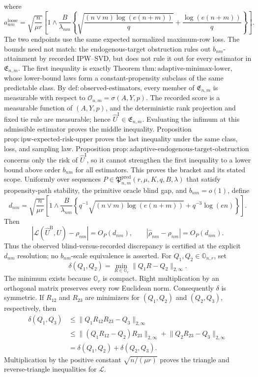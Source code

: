 where
\[
 a^{\mathrm{loose}}_{nm}=
 \sqrt{\frac n{\mu r}}\left[1\wedge
 \frac B{\lambda_{nm}}\left\{
 \sqrt{\frac{(n\vee m)\log(e(n+m))}{q}}+
 \frac{\log(e(n+m))}{q}\right\}\right].
\]
The two endpoints use the same expected normalized maximum-row loss.  The bounds need not match: the endogenous-target obstruction rules out \(b_{nm}\)-attainment by recorded IPW--SVD, but does not rule it out for every estimator in \(\mathfrak E_{n,m}\).
The first inequality is exactly Theorem \(\mathrm{thm:adaptive\mbox{-}minimax\mbox{-}lower}\), whose lower-bound laws form a constant-propensity subclass of the same predictable class.  By \(\mathrm{def:observed\mbox{-}estimators}\), every member of \(\mathfrak E_{n,m}\) is measurable with respect to \(\mathcal O_{n,m}=\sigma(A,Y,p)\).  The recorded score is a measurable function of \((A,Y,p)\), and the deterministic rank projection and fixed tie rule are measurable; hence \(\widehat U^{\mathrm I}\in\mathfrak E_{n,m}\).  Evaluating the infimum at this admissible estimator proves the middle inequality.  Proposition \(\mathrm{prop:ipw\mbox{-}expected\mbox{-}risk\mbox{-}upper}\) proves the last inequality under the same class, loss, and sampling law.  Proposition \(\mathrm{prop:adaptive\mbox{-}endogenous\mbox{-}target\mbox{-}obstruction}\) concerns only the risk of \(\widehat U^{\mathrm I}\), so it cannot strengthen the first inequality to a lower bound above order \(b_{nm}\) for all estimators.  This proves the bracket and its stated scope.
Uniformly over sequences \(P\in\mathfrak P^{\mathrm{pred}}_{n,m}(r,\mu,K,q,B,\lambda)\) that satisfy propensity-path stability, the primitive oracle blind gap, and \(b_{nm}=o(1)\), define
\[
 d_{nm}=\sqrt{\frac n{\mu r}}\left[1\wedge
 \frac B{\lambda_{nm}}\left\{
 q^{-1}\sqrt{(n\vee m)\log(e(n+m))}+q^{-3}\log(en)
 \right\}\right].
\]
Then
\[
 \left|\mathcal L(\widehat U^{\mathrm B},U)-\rho_{nm}\right|=O_P(d_{nm}),
 \qquad
 |\widehat\rho_{nm}-\rho_{nm}|=O_P(d_{nm}).
\]
Thus the observed blind-versus-recorded discrepancy is certified at the explicit \(d_{nm}\) resolution; no \(b_{nm}\)-scale equivalence is asserted.
For \(Q_1,Q_2\in\mathbb O_{n,r}\), set
\[
 \delta(Q_1,Q_2)=\min_{R\in\mathbb O_r}
 \lVert Q_1R-Q_2\rVert_{2,\infty}.
\]
The minimum exists because \(\mathbb O_r\) is compact.  Right multiplication by an orthogonal matrix preserves every row Euclidean norm.  Consequently \(\delta\) is symmetric.  If \(R_{12}\) and \(R_{23}\) are minimizers for \((Q_1,Q_2)\) and \((Q_2,Q_3)\), respectively, then
\[
 \begin{aligned}
 \delta(Q_1,Q_3)
 &\le\lVert Q_1R_{12}R_{23}-Q_3\rVert_{2,\infty}\\
 &\le\lVert(Q_1R_{12}-Q_2)R_{23}\rVert_{2,\infty}
 +\lVert Q_2R_{23}-Q_3\rVert_{2,\infty}\\
 &=\delta(Q_1,Q_2)+\delta(Q_2,Q_3).
 \end{aligned}
\]
Multiplication by the positive constant \(\sqrt{n/(\mu r)}\) proves the triangle and reverse-triangle inequalities for \(\mathcal L\).

